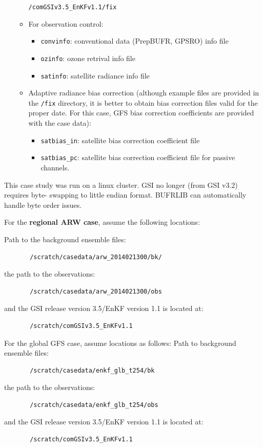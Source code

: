 \begin{enumerate}
\begin{itemize}
\verb|/comGSIv3.5_EnKFv1.1/fix|
\item For observation control:
\begin{itemize}
\item \verb|convinfo|: conventional data (PrepBUFR, GPSRO) info file 
\item \verb|ozinfo|: ozone retrival info file
\item \verb|satinfo|: satellite radiance info file 
\end{itemize}
\item Adaptive radiance bias correction (although example files are provided in the \verb|/fix| directory, it is better to obtain bias correction files valid for the proper date. For this case, GFS bias correction coefficients are provided with the case data):
\begin{itemize} 
\item \verb|satbias_in|: satellite bias correction coefficient file
\item \verb|satbias_pc|: satellite bias correction coefficient file for passive channels.
\end{itemize}
\end{itemize}
\end{enumerate}



This case study was run on a linux cluster. GSI no longer (from GSI v3.2) requires byte- swapping to little endian format. BUFRLIB can automatically handle byte order issues.

For the \textbf{regional ARW case}, assume the following locations:

Path to the background ensemble files:
\begin{verbatim}
       /scratch/casedata/arw_2014021300/bk/
\end{verbatim}
the path to the observations:
\begin{verbatim}
       /scratch/casedata/arw_2014021300/obs
\end{verbatim}
and the GSI release version 3.5/EnKF version 1.1 is located at:
\begin{verbatim}
       /scratch/comGSIv3.5_EnKFv1.1
\end{verbatim}
For the global GFS case, assume locations as follows: Path to background ensemble files:
\begin{verbatim}
       /scratch/casedata/enkf_glb_t254/bk
\end{verbatim}
the path to the observations:
\begin{verbatim}
       /scratch/casedata/enkf_glb_t254/obs
\end{verbatim}
and the GSI release version 3.5/EnKF version 1.1 is located at:
\begin{verbatim}
       /scratch/comGSIv3.5_EnKFv1.1
\end{verbatim}


